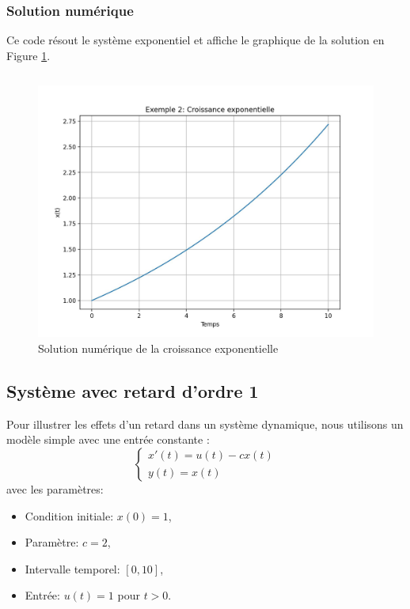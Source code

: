             \subsubsection{Solution numérique}
                Ce code résout le système exponentiel et affiche le graphique de la solution en Figure \ref{fig:croissance_exponentielle}. 
                \inputminted{python}{codes/croissance_exponentielle.py}
                \begin{figure}[ht!]
                    \centering
                    \includegraphics[width=\textwidth]{images/croissance_exponentielle.jpg}
                    \caption{Solution numérique de la croissance exponentielle}
                    \label{fig:croissance_exponentielle}
                \end{figure}

        \subsection{Système avec retard d'ordre 1}
            Pour illustrer les effets d'un retard dans un système dynamique, nous utilisons un modèle simple avec une entrée constante :
            \begin{equation*}
            \begin{cases}
            x'(t)=u(t)-cx(t)\\
            y(t)=x(t)
            \end{cases}
            \end{equation*}
            avec les paramètres:
            \begin{itemize}
                \item Condition initiale: $x(0)=1$,
                \item Paramètre: $c=2$,
                \item Intervalle temporel: $[0,10]$,
                \item Entrée: $u(t)=1$ pour $t>0$.
            \end{itemize}
        

